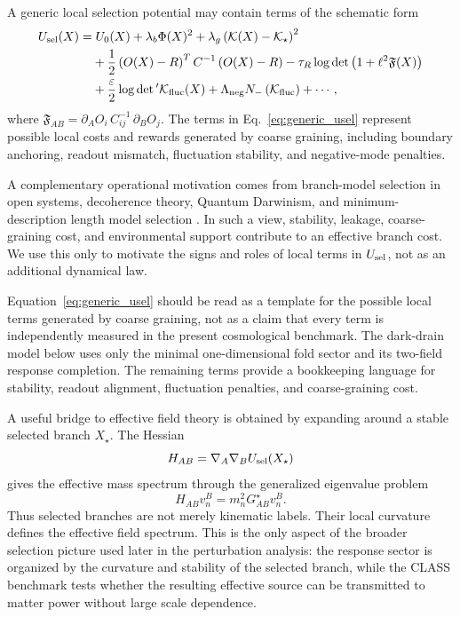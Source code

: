 ﻿\documentclass[11pt,prd,preprint,nofootinbib,amsmath,amssymb]{revtex4-2}
\begin{document}
A generic local selection potential may contain terms of the schematic form
\begin{align}
U_{\rm sel}(X)
=&\;
U_0(X)
+\lambda_b\Phi(X)^2
+\lambda_g\left(\mathcal K(X)-\mathcal K_\star\right)^2
\nonumber\\
&+
\frac12\left(O(X)-R\right)^T C^{-1}\left(O(X)-R\right)
-\tau_R\log\det\left(1+\ell^2\mathfrak F(X)\right)
\nonumber\\
&+
\frac{\varepsilon}{2}\log\det{}'\mathcal K_{\rm fluc}(X)
+
\Lambda_{\rm neg}N_-\left(\mathcal K_{\rm fluc}\right)
+\cdots ,
\label{eq:generic_usel}
\end{align}
where $\mathfrak F_{AB}=\partial_AO_i\,C^{-1}_{ij}\,\partial_BO_j$. The terms
in Eq.~\eqref{eq:generic_usel} represent possible local costs and rewards
generated by coarse graining, including boundary anchoring, readout mismatch,
fluctuation stability, and negative-mode penalties.

A complementary operational motivation comes from branch-model selection in
open systems, decoherence theory, Quantum Darwinism, and minimum-description
length model selection
\cite{Zurek2003,Schlosshauer2007,Zurek2009,Rissanen1978,Grunwald2007}.
In such a view, stability, leakage, coarse-graining cost, and environmental
support contribute to an effective branch cost. We use this only to motivate
the signs and roles of local terms in $U_{\rm sel}$, not as an additional
dynamical law.

Equation~\eqref{eq:generic_usel} should be read as a template for the possible
local terms generated by coarse graining, not as a claim that every term is
independently measured in the present cosmological benchmark. The dark-drain
model below uses only the minimal one-dimensional fold sector and its
two-field response completion. The remaining terms provide a bookkeeping
language for stability, readout alignment, fluctuation penalties, and
coarse-graining cost.

A useful bridge to effective field theory is obtained by expanding around a stable selected branch $X_\star$. The Hessian
\begin{equation}
H_{AB}=\nabla_A\nabla_B U_{\rm sel}(X_\star)
\end{equation}
gives the effective mass spectrum through the generalized eigenvalue problem
\begin{equation}
H_{AB}v_n^B=m_n^2G^\star_{AB}v_n^B.
\end{equation}
Thus selected branches are not merely kinematic labels. Their local curvature defines the effective field spectrum.
This is the only aspect of the broader selection picture used later in the
perturbation analysis: the response sector is organized by the curvature and
stability of the selected branch, while the CLASS benchmark tests whether the
resulting effective source can be transmitted to matter power without
large scale dependence.
\end{document}
